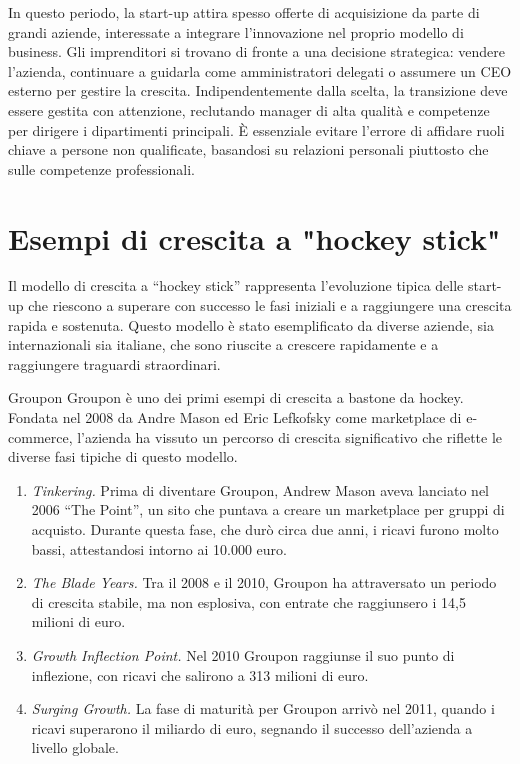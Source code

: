 \begin{enumerate}
    In questo periodo, la start-up attira spesso offerte di acquisizione da parte di grandi aziende, interessate a integrare l’innovazione nel proprio modello di business. Gli imprenditori si trovano di fronte a una decisione strategica: vendere l’azienda, continuare a guidarla come amministratori delegati o assumere un CEO esterno per gestire la crescita. Indipendentemente dalla scelta, la transizione deve essere gestita con attenzione, reclutando manager di alta qualità e competenze per dirigere i dipartimenti principali. È essenziale evitare l’errore di affidare ruoli chiave a persone non qualificate, basandosi su relazioni personali piuttosto che sulle competenze professionali.
\end{enumerate}

\section{Esempi di crescita a "hockey stick"}
Il modello di crescita a “hockey stick” rappresenta l’evoluzione tipica delle start-up che riescono a superare con successo le fasi iniziali e a raggiungere una crescita rapida e sostenuta. Questo modello è stato esemplificato da diverse aziende, sia internazionali sia italiane, che sono riuscite a crescere rapidamente e a raggiungere traguardi straordinari.

\begin{Example}{Groupon}{}
Groupon è uno dei primi esempi di crescita a bastone da hockey. Fondata nel 2008 da Andre Mason ed Eric Lefkofsky come marketplace di e-commerce, l’azienda ha vissuto un percorso di crescita significativo che riflette le diverse fasi tipiche di questo modello.
\begin{enumerate}
    \item \textit{Tinkering.} Prima di diventare Groupon, Andrew Mason aveva lanciato nel 2006 “The Point”, un sito che puntava a creare un marketplace per gruppi di acquisto. Durante questa fase, che durò circa due anni, i ricavi furono molto bassi, attestandosi intorno ai 10.000 euro.
    \item \textit{The Blade Years.} Tra il 2008 e il 2010, Groupon ha attraversato un periodo di crescita stabile, ma non esplosiva, con entrate che raggiunsero i 14,5 milioni di euro.
    \item \textit{Growth Inflection Point.} Nel 2010 Groupon raggiunse il suo punto di inflezione, con ricavi che salirono a 313 milioni di euro.
    \item \textit{Surging Growth.} La fase di maturità per Groupon arrivò nel 2011, quando i ricavi superarono il miliardo di euro, segnando il successo dell’azienda a livello globale.
\end{enumerate}    
\end{Example}

